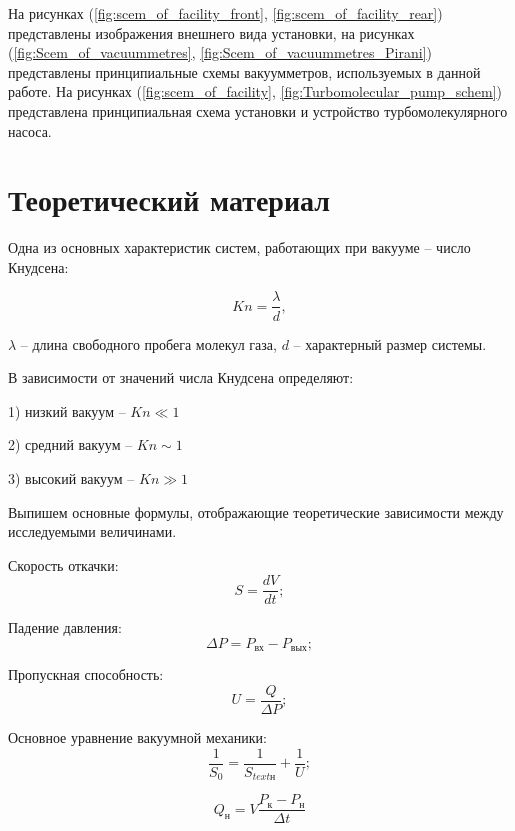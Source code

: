 \documentclass[12pt,a4paper]{article}
\begin{document}
	На рисунках (\ref{fig:scem_of_facility_front}, \ref{fig:scem_of_facility_rear}) представлены изображения внешнего вида установки, на рисунках (\ref{fig:Scem_of_vacuummetres}, \ref{fig:Scem_of_vacuummetres_Pirani}) представлены принципиальные схемы вакуумметров, используемых в данной работе. На рисунках (\ref{fig:scem_of_facility}, \ref{fig:Turbomolecular_pump_schem}) представлена принципиальная схема установки и устройство турбомолекулярного насоса.
	
	
	\section{Теоретический материал}

	Одна из основных характеристик систем, работающих при вакууме -- число Кнудсена:
	
	\begin{equation}
		Kn = \frac{\lambda}{d}, 
	\end{equation}

	$\lambda$ -- длина свободного пробега молекул газа, $d$ -- характерный размер системы.
	
	В зависимости от значений числа Кнудсена определяют:
	
	1) низкий вакуум -- $Kn \ll 1$
	
	2) средний вакуум -- $Kn \sim 1$
	
	3) высокий вакуум -- $Kn \gg 1$
	
	Выпишем основные формулы, отображающие теоретические зависимости между исследуемыми величинами.
	
	
		Скорость откачки:
	\begin{equation}
		S = \frac{dV}{dt};
	\end{equation}	
	
		Падение давления:
	\begin{equation}
		\Delta P = P_{\text{вх}} - P_{\text{вых}};
	\end{equation}
		
		Пропускная способность:
	\begin{equation}
		U = \frac{Q}{\Delta P};
	\end{equation}
	
		Основное уравнение вакуумной механики:
	\begin{equation}
		\frac{1}{S_{0}} = \frac{1}{S_{text{н}}} + \frac{1}{U};
	\end{equation} 
	
	\begin{equation}
		Q_{\text{н}} = V\frac{P_{\text{к}} - P_{\text{н}}}{\Delta t}		
	\end{equation}
	
\end{document}
